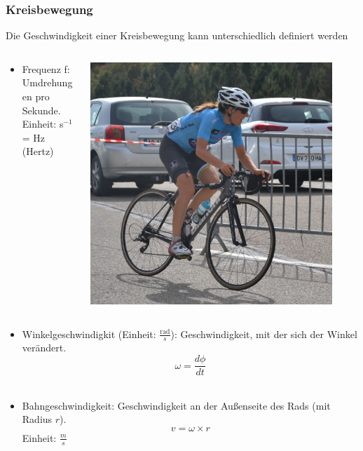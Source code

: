 \documentclass{beamer}
\begin{document}
\begin{frame}
\frametitle{Kreisbewegung}

Die Geschwindigkeit einer Kreisbewegung kann unterschiedlich definiert werden


\begin{columns}[c]

\begin{column}{8cm}

\begin{itemize}
\item
Frequenz f: Umdrehungen pro Sekunde. \\
Einheit: s$^{-1}$ =  Hz (Hertz) \\

\end{itemize}

\end{column}

\begin{column}{3cm}
\begin{center}
\includegraphics[width=0.9\textwidth]{fahrrad.jpg}
\end{center}
\end{column}


\end{columns}




\begin{itemize}
\item
Winkelgeschwindigkit (Einheit: \(\frac{\text{rad}}{s}\)): Geschwindigkeit, mit der sich der Winkel verändert. 
\[
\omega = \frac{d\phi}{dt} 
\]
\\
\item
Bahngeschwindigkeit: Geschwindigkeit an der Außenseite des Rads (mit Radius \(r\)). 
\[
v = \omega \times r
\]
Einheit: \(\frac{m}{s}\)
\end{itemize}


\end{frame}
\end{document}

